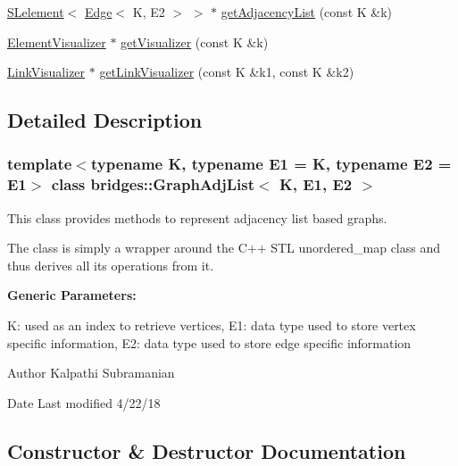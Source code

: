 \begin{DoxyCompactItemize}
\item 
\mbox{\hyperlink{classbridges_1_1_s_lelement}{S\+Lelement}}$<$ \mbox{\hyperlink{classbridges_1_1_edge}{Edge}}$<$ K, E2 $>$ $>$ $\ast$ \mbox{\hyperlink{classbridges_1_1_graph_adj_list_ab9eb791b7c242742ac832121f297acdc}{get\+Adjacency\+List}} (const K \&k)
\item 
\mbox{\hyperlink{classbridges_1_1_element_visualizer}{Element\+Visualizer}} $\ast$ \mbox{\hyperlink{classbridges_1_1_graph_adj_list_a1c2c773a13dbd1fddd55bc2642c08574}{get\+Visualizer}} (const K \&k)
\item 
\mbox{\hyperlink{classbridges_1_1_link_visualizer}{Link\+Visualizer}} $\ast$ \mbox{\hyperlink{classbridges_1_1_graph_adj_list_a6e065b1411388387ff1e4df9227ce480}{get\+Link\+Visualizer}} (const K \&k1, const K \&k2)
\end{DoxyCompactItemize}


\subsection{Detailed Description}
\subsubsection*{template$<$typename K, typename E1 = K, typename E2 = E1$>$\newline
class bridges\+::\+Graph\+Adj\+List$<$ K, E1, E2 $>$}

This class provides methods to represent adjacency list based graphs. 

The class is simply a wrapper around the C++ S\+TL unordered\+\_\+map class and thus derives all its operations from it.

{\bfseries Generic Parameters\+:} \begin{DoxyVerb}     K:  used as an index to retrieve vertices, 
     E1: data type used to store vertex specific information, 
     E2: data type used to store edge specific information
\end{DoxyVerb}


\begin{DoxyAuthor}{Author}
Kalpathi Subramanian 
\end{DoxyAuthor}
\begin{DoxyDate}{Date}
Last modified 4/22/18 
\end{DoxyDate}


\subsection{Constructor \& Destructor Documentation}
\mbox{\label{classbridges_1_1_graph_adj_list_af7acceab0f85c75de56cf2fc74b3690b}} 
